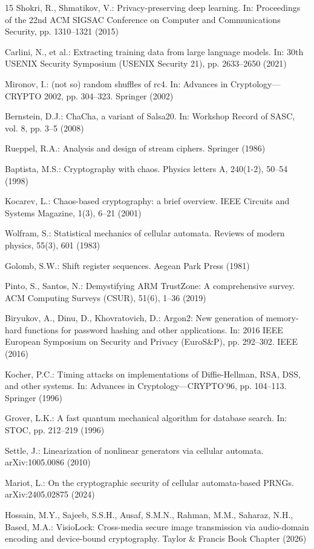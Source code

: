 \documentclass[runningheads]{llncs}
\begin{document}
\begin{thebibliography}{15}
Shokri, R., Shmatikov, V.: Privacy-preserving deep learning. In: Proceedings of the 22nd ACM SIGSAC Conference on Computer and Communications Security, pp. 1310--1321 (2015)

Carlini, N., et al.: Extracting training data from large language models. In: 30th USENIX Security Symposium (USENIX Security 21), pp. 2633--2650 (2021)

Mironov, I.: (not so) random shuffles of rc4. In: Advances in Cryptology---CRYPTO 2002, pp. 304--323. Springer (2002)

Bernstein, D.J.: ChaCha, a variant of Salsa20. In: Workshop Record of SASC, vol. 8, pp. 3--5 (2008)

Rueppel, R.A.: Analysis and design of stream ciphers. Springer (1986)

Baptista, M.S.: Cryptography with chaos. Physics letters A, 240(1-2), 50--54 (1998)

Kocarev, L.: Chaos-based cryptography: a brief overview. IEEE Circuits and Systems Magazine, 1(3), 6--21 (2001)

Wolfram, S.: Statistical mechanics of cellular automata. Reviews of modern physics, 55(3), 601 (1983)

Golomb, S.W.: Shift register sequences. Aegean Park Press (1981)

Pinto, S., Santos, N.: Demystifying ARM TrustZone: A comprehensive survey. ACM Computing Surveys (CSUR), 51(6), 1--36 (2019)

Biryukov, A., Dinu, D., Khovratovich, D.: Argon2: New generation of memory-hard functions for password hashing and other applications. In: 2016 IEEE European Symposium on Security and Privacy (EuroS\&P), pp. 292--302. IEEE (2016)

Kocher, P.C.: Timing attacks on implementations of Diffie-Hellman, RSA, DSS, and other systems. In: Advances in Cryptology---CRYPTO'96, pp. 104--113. Springer (1996)

Grover, L.K.: A fast quantum mechanical algorithm for database search. In: STOC, pp. 212--219 (1996)

Settle, J.: Linearization of nonlinear generators via cellular automata. arXiv:1005.0086 (2010)

Mariot, L.: On the cryptographic security of cellular automata-based PRNGs. arXiv:2405.02875 (2024)

Hossain, M.Y., Sajeeb, S.S.H., Ausaf, S.M.N., Rahman, M.M., Saharaz, N.H., Based, M.A.: VisioLock: Cross-media secure image transmission via audio-domain encoding and device-bound cryptography. Taylor \& Francis Book Chapter (2026)
\end{thebibliography}
\end{document}

